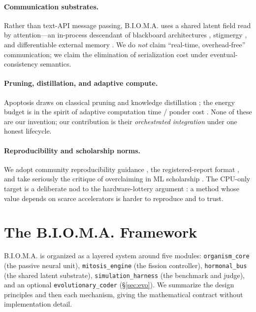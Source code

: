 \documentclass[11pt]{article}
\newcommand{\bioma}{\textsc{B.I.O.M.A.}}
\begin{document}
\paragraph{Communication substrates.}
Rather than text-API message passing, \bioma{} uses a shared latent field read
by attention---an in-process descendant of blackboard architectures
\cite{hayesroth1985blackboard}, stigmergy \cite{dorigo1996ant}, and
differentiable external memory \cite{graves2016dnc,vaswani2017attention}. We do
\emph{not} claim ``real-time, overhead-free'' communication; we claim the
elimination of serialization cost under eventual-consistency semantics.

\paragraph{Pruning, distillation, and adaptive compute.}
Apoptosis draws on classical pruning \cite{lecun1990obd,frankle2019lottery} and
knowledge distillation \cite{hinton2015distill}; the energy budget is in the
spirit of adaptive computation time / ponder cost \cite{graves2016act}. None of
these are our invention; our contribution is their \emph{orchestrated
integration} under one honest lifecycle.

\paragraph{Reproducibility and scholarship norms.}
We adopt community reproducibility guidance
\cite{pineau2021repro,gundersen2018repro}, the registered-report format
\cite{chambers2013registered}, and take seriously the critique of overclaiming
in ML scholarship \cite{lipton2019troubling}. The CPU-only target is a
deliberate nod to the hardware-lottery argument \cite{hooker2021hardware}: a
method whose value depends on scarce accelerators is harder to reproduce and to
trust.

\section{The \bioma{} Framework}
\label{sec:framework}
\bioma{} is organized as a layered system around five modules:
\texttt{organism\_core} (the passive neural unit), \texttt{mitosis\_engine} (the
fission controller), \texttt{hormonal\_bus} (the shared latent substrate),
\texttt{simulation\_harness} (the benchmark and judge), and an optional
\texttt{evolutionary\_coder} (\S\ref{sec:evo}). We summarize the design
principles and then each mechanism, giving the mathematical contract without
implementation detail.
\end{document}
